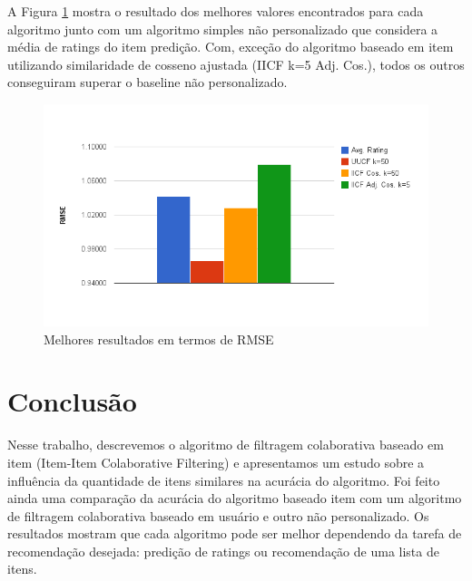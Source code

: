 \documentclass[12pt, a4paper, oneside]{article}
\begin{document}
A Figura \ref{fig:baselines-rmse} mostra o resultado dos melhores valores encontrados para cada algoritmo junto com um
algoritmo simples não personalizado que considera a média de ratings do item predição. Com, exceção do algoritmo baseado em item utilizando similaridade de cosseno ajustada (IICF k=5 Adj. Cos.), todos os outros conseguiram superar o baseline não personalizado.

\begin{figure}[!ht]
\centering
\includegraphics[scale=.45]{img/baseline-rmse.png} 
\caption{Melhores resultados em termos de RMSE}
\label{fig:baselines-rmse}
\end{figure}


\section{Conclusão}
\label{sec:conclusao}
Nesse trabalho, descrevemos o algoritmo de filtragem colaborativa baseado em item (Item-Item Colaborative Filtering) e apresentamos um estudo sobre a influência da quantidade de itens similares na acurácia do algoritmo. Foi feito ainda uma comparação da acurácia do algoritmo baseado item com um algoritmo de filtragem colaborativa baseado em usuário e outro não personalizado. Os resultados mostram que cada algoritmo pode ser melhor dependendo da tarefa de recomendação desejada: predição de ratings ou recomendação de uma lista de itens.



\end{document}

